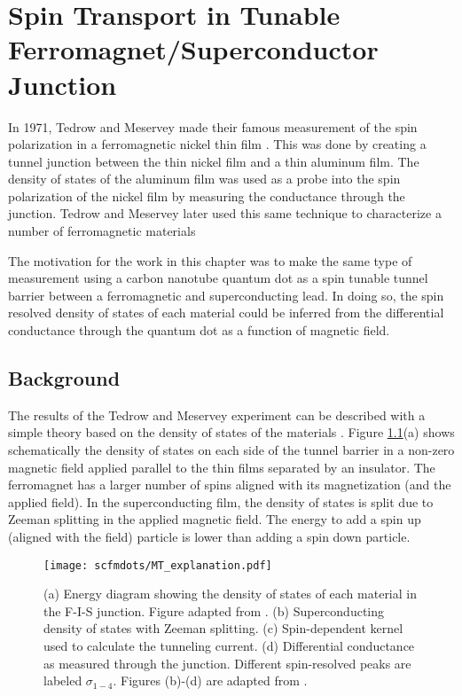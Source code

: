 \chapter{Spin Transport in Tunable Ferromagnet/Superconductor Junction}
\label{sec:SCFM}


In 1971, Tedrow and Meservey made their famous measurement of the spin polarization in a ferromagnetic nickel thin film \cite{Tedrow1971}. This was done by creating a tunnel junction between the thin nickel film and a thin aluminum film. The density of states of the aluminum film was used as a probe into the spin polarization of the nickel film by measuring the conductance through the junction. Tedrow and Meservey later used this same technique to characterize a number of ferromagnetic materials \cite{Tedrow1973}

The motivation for the work in this chapter was to make the same type of measurement using a carbon nanotube quantum dot as a spin tunable tunnel barrier between a ferromagnetic and superconducting lead. In doing so, the spin resolved density of states of each material could be inferred from the differential conductance through the quantum dot as a function of magnetic field.

\section{Background}

The results of the Tedrow and Meservey experiment can be described with a simple theory based on the density of states of the materials \cite{Meservey1994}. Figure \ref{fig:MT_explanation}(a) shows schematically the density of states on each side of the tunnel barrier in a non-zero magnetic field applied parallel to the thin films separated by an insulator. The ferromagnet has a larger number of spins aligned with its magnetization (and the applied field). In the superconducting film, the density of states is split due to Zeeman splitting in the applied magnetic field. The energy to add a spin up (aligned with the field) particle is lower than adding a spin down particle. 

\begin{figure}
    \centering
    \texttt{[image: scfmdots/MT\_explanation.pdf]}
    \caption{(a) Energy diagram showing the density of states of each material in the F-I-S junction. Figure adapted from \cite{Moodera2010}. (b) Superconducting density of states with Zeeman splitting. (c) Spin-dependent kernel used to calculate the tunneling current. (d) Differential conductance as measured through the junction. Different spin-resolved peaks are labeled $\sigma_{1-4}$. Figures (b)-(d) are adapted from \cite{Meservey1994}.}
    \label{fig:MT_explanation}
\end{figure}

